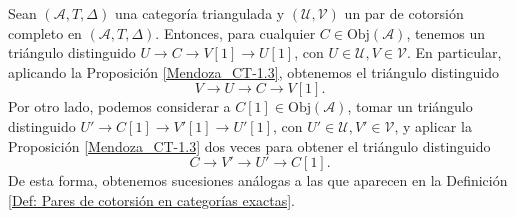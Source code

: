 \documentclass[tesis]{subfiles}
\begin{document}
\begin{Obs}
    Sean $(\mathscr{A},T,\Delta)$ una categoría triangulada y $(\mathcal{U},\mathcal{V})$ un par de cotorsión completo en $(\mathscr{A},T,\Delta)$. Entonces, para cualquier $C\in\text{Obj}(\mathscr{A})$, tenemos un triángulo distinguido $U\to C\to V[1]\to U[1]$, con $U\in\mathcal{U}, V\in\mathcal{V}$. En particular, aplicando la Proposición \ref{Mendoza_CT-1.3}, obtenemos el triángulo distinguido
    \[
        V\to U\to C\to V[1].
    \] 
    Por otro lado, podemos considerar a $C[1]\in\text{Obj}(\mathscr{A})$, tomar un triángulo distinguido $U'\to C[1]\to V'[1]\to U'[1]$, con $U'\in\mathcal{U}, V'\in\mathcal{V}$, y aplicar la Proposición \ref{Mendoza_CT-1.3} dos veces para obtener el triángulo distinguido
    \[
        C \to V' \to U' \to C[1].
    \] 
    De esta forma, obtenemos sucesiones análogas a las que aparecen en la Definición \ref{Def: Pares de cotorsión en categorías exactas}.
    
\end{Obs}
\end{document}
